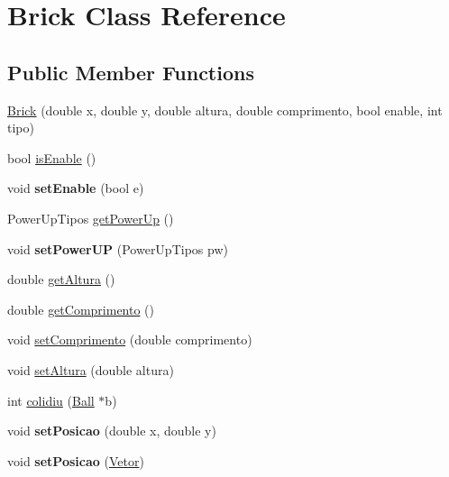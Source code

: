 \hypertarget{class_brick}{\section{\-Brick \-Class \-Reference}
\label{class_brick}
}
\subsection*{\-Public \-Member \-Functions}
\begin{DoxyCompactItemize}
\item 
\hyperlink{class_brick_a578027ce8028b8e29c018a654fbb6db7}{\-Brick} (double x, double y, double altura, double comprimento, bool enable, int tipo)
\item 
bool \hyperlink{class_brick_adc0468d78a1041d703bd28835f2205d9}{is\-Enable} ()
\item 
\hypertarget{class_brick_a334baedfa658293087b2e6b5c7df0180}{void {\bfseries set\-Enable} (bool e)}\label{class_brick_a334baedfa658293087b2e6b5c7df0180}

\item 
\-Power\-Up\-Tipos \hyperlink{class_brick_a24d61a6c440e7b964c7741ec82400ea7}{get\-Power\-Up} ()
\item 
\hypertarget{class_brick_a955a4422c60b8461c984c7b7a5cfc949}{void {\bfseries set\-Power\-U\-P} (\-Power\-Up\-Tipos pw)}\label{class_brick_a955a4422c60b8461c984c7b7a5cfc949}

\item 
double \hyperlink{class_brick_a3c70b1c24c0195ca8dc459aa29555891}{get\-Altura} ()
\item 
double \hyperlink{class_brick_aa7f97b8ef65355a739da1b1f5d529f97}{get\-Comprimento} ()
\item 
void \hyperlink{class_brick_af33abfb1b06a5b3488c63dc43f9c53b0}{set\-Comprimento} (double comprimento)
\item 
void \hyperlink{class_brick_ac022ec72de65760e8bf28838a7586385}{set\-Altura} (double altura)
\item 
int \hyperlink{class_brick_a2d4a47982dd191d68e2872bd8ef3c9f2}{colidiu} (\hyperlink{class_ball}{\-Ball} $\ast$b)
\item 
\hypertarget{class_brick_a992a0b5902205c2774a75495bf0fd3ac}{void {\bfseries set\-Posicao} (double x, double y)}\label{class_brick_a992a0b5902205c2774a75495bf0fd3ac}

\item 
\hypertarget{class_brick_abb1b859e2eb586f0aaa1a47891b7123a}{void {\bfseries set\-Posicao} (\hyperlink{class_vetor}{\-Vetor})}\label{class_brick_abb1b859e2eb586f0aaa1a47891b7123a}


\end{DoxyCompactItemize}
